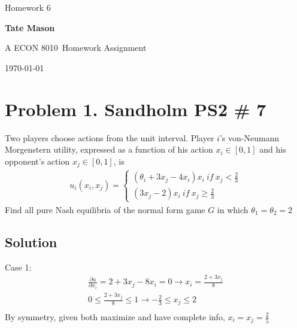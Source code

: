 \documentclass[10pt, a4paper]{article}
\newcommand\course{ECON 8010}                            %
\newcommand\hwnumber{6}                                  %
\newcommand\Information{Tate Mason}                        %
\begin{document}
  \begin{titlepage}
    \begin{center}
      \vspace*{3cm}
            
        \vspace{1cm}
        \huge
        Homework \hwnumber
            
        \vspace{1.5cm}
        \Large
            
        \textbf{\Information}                      %
            
        \vfill
        
        A \course \ Homework Assignment
            
        \vspace{1cm}
        \Large

        
        \today
            
    \end{center}
  \end{titlepage}

  \newpage
\section*{Problem 1. Sandholm PS2 \# 7}
  Two players choose actions from the unit interval. Player $i$'s von-Neumann Morgenstern utility, expressed as a function of his action $x_i\in[0,1]$ and his opponent's action $x_j\in[0,1]$, is 
    \begin{gather*}
      u_i(x_i,x_j) = \begin{cases}
        (\theta_i+3x_j-4x_i)x_i \ if \ x_j<\frac{2}{3}\\
        (3x_j-2)x_i \ if \ x_j\geq\frac{2}{3}
      \end{cases}
    \end{gather*}
    Find all pure Nash equilibria of the normal form game $G$ in which $\theta_1=\theta_2=2$ 
  \subsection*{Solution}
    Case 1:
    \begin{gather*}
      \frac{\partial u}{\partial x_i} = 2 + 3x_j - 8x_i = 0 \rightarrow x_i = \frac{2+3x_j}{8} \\
      0 \leq \frac{2+3x_j}{8} \leq 1 \rightarrow -\frac{2}{3} \leq x_j \leq 2\\
    \end{gather*}
    By symmetry, given both maximize and have complete info, $x_i=x_j=\frac{2}{5}$
\end{document}
